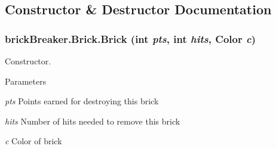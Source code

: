 \subsection{Constructor \& Destructor Documentation}
\hypertarget{classbrick_breaker_1_1_brick_a48498f7c136cce1f0742ec4406ac2831}{
\subsubsection[{Brick}]{\setlength{\rightskip}{0pt plus 5cm}brickBreaker.Brick.Brick (int {\em pts}, \/  int {\em hits}, \/  Color {\em c})}}
\label{classbrick_breaker_1_1_brick_a48498f7c136cce1f0742ec4406ac2831}
Constructor.


\begin{DoxyParams}{Parameters}
\item[{\em pts}]Points earned for destroying this brick \item[{\em hits}]Number of hits needed to remove this brick \item[{\em c}]Color of brick \end{DoxyParams}


